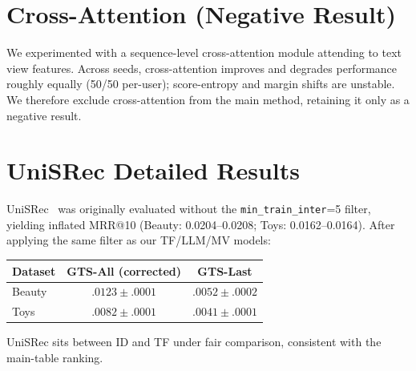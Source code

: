 \documentclass[sigconf,natbib=true,anonymous]{acmart}
\begin{document}
\section{Cross-Attention (Negative Result)}
\label{app:cross}

We experimented with a sequence-level cross-attention module attending to text view features.
Across seeds, cross-attention improves and degrades performance roughly equally (50/50 per-user);  score-entropy and margin shifts are unstable.
We therefore exclude cross-attention from the main method, retaining it only as a negative result.

\section{UniSRec Detailed Results}
\label{app:unisrec}

UniSRec~\cite{hou2022unisrec} was originally evaluated without the \texttt{min\_train\_inter}=5 filter, yielding inflated MRR@10 (Beauty: 0.0204--0.0208; Toys: 0.0162--0.0164).
After applying the same filter as our TF/LLM/MV models:

\begin{table}[h]
\centering
\small
\begin{tabular}{@{}lcc@{}}
\toprule
Dataset & GTS-All (corrected) & GTS-Last \\
\midrule
Beauty & $.0123 \pm .0001$ & $.0052 \pm .0002$ \\
Toys   & $.0082 \pm .0001$ & $.0041 \pm .0001$ \\
\bottomrule
\end{tabular}
\end{table}

UniSRec sits between ID and TF under fair comparison, consistent with the main-table ranking.
\end{document}
